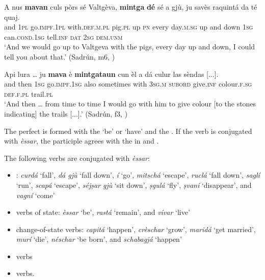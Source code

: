 \ea\label{ex:impf:4}
\gll    A nus \textbf{mavan} culs pòrs sé Valtgèva, \textbf{mintga} \textbf{dé} sé a gjù, ju savès raquintá da té quaj.\\
and \textsc{1pl}  go.\textsc{impf.1pl} with.\textsc{def.m.pl} pig.\textsc{pl} up \textsc{pn} every day.\textsc{m.sg} up and down  \textsc{1sg}  can.\textsc{cond.1sg}  tell.\textsc{inf}  \textsc{dat}  \textsc{2sg} \textsc{dem.unm}\\
\glt `And we would go up to Valtgeva with the pigs, every day up and down, I could tell you about that.' (Sadrún, m6, )
\z

\ea\label{ex:impf:5}
\gll  Api lura … ju \textbf{mava} è \textbf{mintgataun} cun èl a dá culur las sèndas [...].\\
and then {} \textsc{1sg} go.\textsc{impf.1sg} also sometimes with \textsc{3sg.m} \textsc{subord} give.\textsc{inf} colour.\textsc{f.sg} \textsc{def.f.pl} trail.\textsc{pl}\\
\glt `And then … from time to time I would go with him to give colour [to the stones indicating] the trails [...].' (Sadrún, f3, )
\z


\label{sec:4.1.2.2.3}
The perfect is formed with the   `be' or  `have' and the . If the verb is conjugated with \textit{èssar}, the participle agrees with the  in  and .

The following verbs are conjugated with \textit{èssar}:

\begin{itemize}
	
	\item {}: \textit{curdá} `fall', \textit{dá gjù} `fall down', \textit{í} `go', \textit{mitschá} `escape', \textit{ruclá} `fall down', \textit{saglí} `run', \textit{scapá} `escape', \textit{séjṣar gjù} `sit down', \textit{ṣgulá} `fly', \textit{ṣvaní} `disappear', and \textit{vagní} `come'
	\item verbs of state: \textit{èssar} `be', \textit{rastá} `remain', and \textit{vívar} `live'
	\item change-of-state verbs: \textit{capitá} `happen',  \textit{crèschar} `grow', \textit{maridá} `get married', \textit{murí} `die', \textit{néschar} `be born', and \textit{schabagjá} `happen'
	\item {} verbs
	\item {} verbs.
	\end{itemize}

